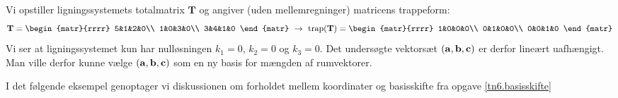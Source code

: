 \begin{example}
Vi opstiller ligningssystemets totalmatrix $\mathbf T$ og angiver (uden mellemregninger) matricens trappeform:
\begin{equation}\mathbf T=
\begin{matr}{rrrr}
 5&1&2&0\\
 1&0&3&0\\
 3&4&1&0
\end{matr}
\,\,\rightarrow\,\,
\mathrm{trap}(\mathbf T)=
\begin{matr}{rrrr}
 1&0&0&0\\
 0&1&0&0\\
 0&0&1&0
\end{matr}
\end{equation}
Vi ser at ligningssystemet kun har nulløsningen $k_1=0$, $k_2=0$ og $k_3=0$. Det undersøgte vektorsæt $(\mathbf{a},\mathbf{b},\mathbf{c})$ er derfor lineært uafhængigt. Man ville derfor kunne vælge $(\mathbf{a},\mathbf{b},\mathbf{c})$ som en ny basis for mængden af rumvektorer.
\end{example}
I det følgende eksempel genoptager vi diskussionen om forholdet mellem koordinater og basisskifte fra opgave \ref{tn6.basisskifte}
